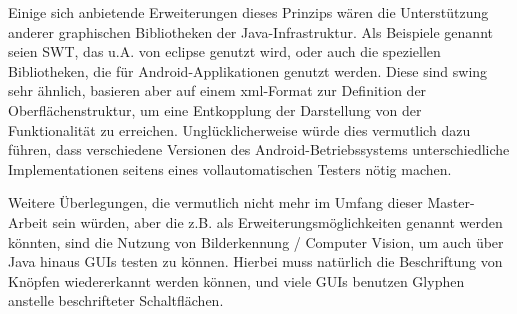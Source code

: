 Einige sich anbietende Erweiterungen dieses Prinzips wären die Unterstützung anderer graphischen Bibliotheken
der Java-Infrastruktur. Als Beispiele genannt seien SWT, das u.A. von eclipse genutzt wird,
oder auch die speziellen Bibliotheken, die für Android-Applikationen genutzt werden.
Diese sind swing sehr ähnlich, basieren aber auf einem xml-Format zur Definition der
Oberflächenstruktur, um eine Entkopplung der Darstellung von der Funktionalität zu erreichen.
Unglücklicherweise würde dies vermutlich dazu führen, dass verschiedene Versionen des
Android-Betriebssystems unterschiedliche Implementationen seitens eines vollautomatischen
Testers nötig machen.
 
Weitere Überlegungen, die vermutlich nicht mehr im Umfang dieser Master-Arbeit sein
würden, aber die z.B. als Erweiterungsmöglichkeiten genannt werden könnten, sind die
Nutzung von Bilderkennung / Computer Vision, um auch über Java hinaus GUIs testen zu
können. Hierbei muss natürlich die Beschriftung von Knöpfen wiedererkannt werden können,
und viele GUIs benutzen Glyphen anstelle beschrifteter Schaltflächen. 
